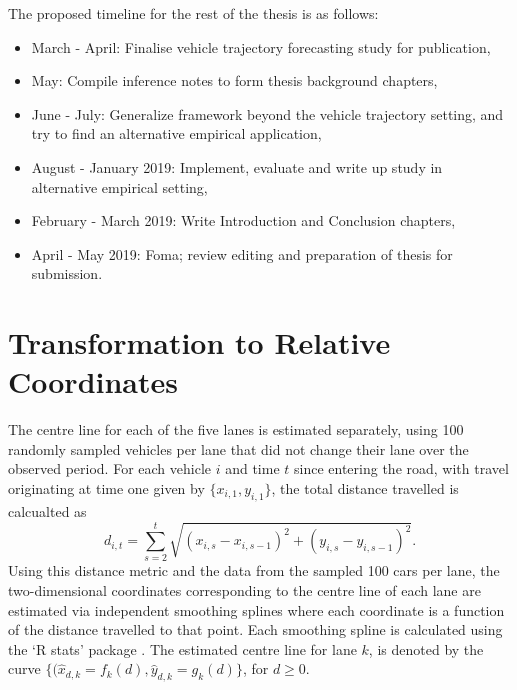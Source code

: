 \documentclass[12pt,a4paper]{article}\usepackage[]{graphicx}\usepackage[]{color}
\begin{document}
The proposed timeline for the rest of the thesis is as follows:
\begin{itemize}
\item March - April: Finalise vehicle trajectory forecasting study for publication,
\item May: Compile inference notes to form thesis background chapters,
\item June - July: Generalize framework beyond the vehicle trajectory setting, and try to find an alternative empirical application,
\item August - January 2019: Implement, evaluate and write up study in alternative empirical setting,
\item February - March 2019: Write Introduction and Conclusion chapters,
\item April - May 2019: Foma; review editing and preparation of thesis for submission.
\end{itemize}




\appendix
\section{Transformation to Relative Coordinates}

The centre line for each of the five lanes is estimated separately, using 100 randomly sampled vehicles per lane that did not change their lane over the observed period. 
For each vehicle $i$ and time $t$ since entering the road, with travel originating at time one given by $\{x_{i,1}, y_{i,1}\}$, the total distance travelled is calcualted as 
\begin{equation}
\label{distance}
d_{i, t} = \sum_{s=2}^t \sqrt{(x_{i, s} - x_{i, s-1})^2 + (y_{i, s} - y_{i, s-1})^2}.
\end{equation}
Using this distance metric and the data from the sampled 100 cars per lane, the two-dimensional coordinates corresponding to the centre line of each lane are estimated via independent smoothing splines where each coordinate is a function of the distance travelled to that point. Each smoothing spline is calculated using the `R stats' package \citep{R}. The estimated centre line for lane $k$, is denoted by the curve $\{(\hat{x}_{d,k} = f_k(d), \hat{y}_{d,k} = g_k(d)\}$, for $d \geq 0$.
\\
\end{document}
